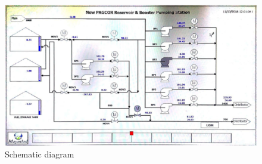 \begin{figure}[h]
	\includegraphics[scale=2.5]{figures/ch04_schematicdiagram} 
	\caption{Schematic diagram}
	\label{ch01_keyplan}
\end{figure}


